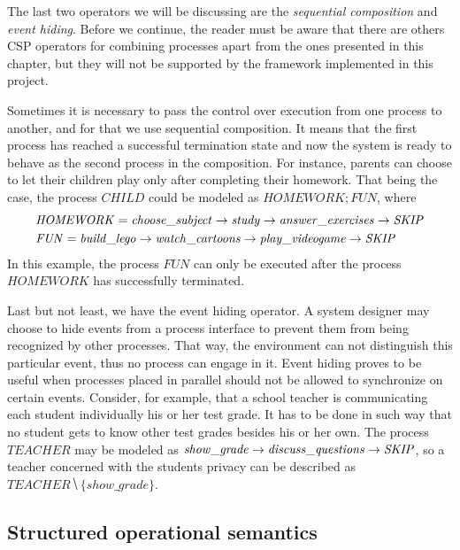 The last two operators we will be discussing are the \emph{sequential composition} and \emph{event hiding}. Before we continue, the reader must be aware that there are others CSP operators for combining processes apart from the ones presented in this chapter, but they will not be supported by the framework implemented in this project.

Sometimes it is necessary to pass the control over execution from one process to another, and for that we use sequential composition. It means that the first process has reached a successful termination state and now the system is ready to behave as the second process in the composition. For instance, parents can choose to let their children play only after completing their homework. That being the case, the process $ \mathit{CHILD} $ could be modeled as $ \mathit{HOMEWORK}\!; \mathit{FUN} $, where
\begin{align}
	&\mathit{HOMEWORK} = \mathit{choose\_subject} \mathrel{\rightarrow} \mathit{study} \mathrel{\rightarrow} \mathit{answer\_exercises} \mathrel{\rightarrow} \mathit{\mathord{{SKIP}}} \notag \\
	&\mathit{FUN} = \mathit{build\_lego} \mathrel{\rightarrow} \mathit{watch\_cartoons} \mathrel{\rightarrow} \mathit{play\_videogame} \mathrel{\rightarrow} \mathit{\mathord{{SKIP}}} \notag
\end{align}
In this example, the process $ \mathit{FUN} $ can only be executed after the process $ \mathit{HOMEWORK} $ has successfully terminated.

Last but not least, we have the event hiding operator. A system designer may choose to hide events from a process interface to prevent them from being recognized by other processes. That way, the environment can not distinguish this particular event, thus no process can engage in it. Event hiding proves to be useful when processes placed in parallel should not be allowed to synchronize on certain events. Consider, for example, that a school teacher is communicating each student individually his or her test grade. It has to be done in such way that no student gets to know other test grades besides his or her own. The process $ \mathit{TEACHER} $ may be modeled as $ \mathit{show\_grade} \mathrel{\rightarrow} \mathit{discuss\_questions} \mathrel{\rightarrow} \mathit{\mathord{{SKIP}}} $, so a teacher concerned with the students privacy can be described as $ \mathit{TEACHER} \hide \{show\_grade\} $.

\subsection{Structured operational semantics}
\label{subsection:sos}

